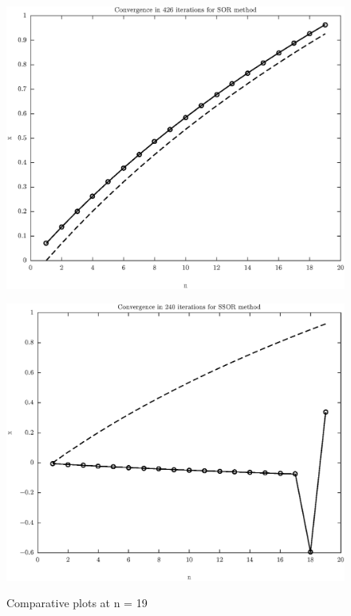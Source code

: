 \documentclass[11pt]{article}
\begin{document}
\begin{figure}
\begin{minipage}{.45\textwidth}
\label{fig:test2}
\end{minipage}\hfill
\\
\begin{minipage}{.45\textwidth}
\centering
\includegraphics[width=\linewidth]{math609_pa2_comp_example_1_n_19_k_SOR_part_a.eps}
\label{fig:test3}
\end{minipage}\hfill
\begin{minipage}{.45\textwidth}
\centering
\includegraphics[width=\linewidth]{math609_pa2_comp_example_1_n_19_k_SSOR_part_a.eps}
\label{fig:test3}
\end{minipage}\hfill
\caption{Comparative plots at n = 19}
\end{figure}
\end{document}
